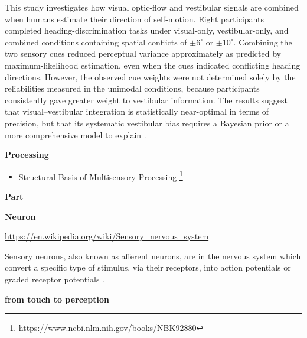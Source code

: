 \documentclass{book}
\providecommand{\ProjectDeepHeading}[2]{%
    \par\medskip\noindent\textbf{#2}\par\smallskip
}
\providecommand{\seeherefooter}[1]{\footnote{\url{#1}}}
\begin{document}
This study investigates how visual optic-flow and vestibular signals are combined when humans estimate their direction of self-motion.
    Eight participants completed heading-discrimination tasks under visual-only, vestibular-only, and combined conditions containing spatial conflicts of $\pm 6^{\circ}$ or $\pm 10^{\circ}$.
    Combining the two sensory cues reduced perceptual variance approximately as predicted by maximum-likelihood estimation, even when the cues indicated conflicting heading directions.
    However, the observed cue weights were not determined solely by the reliabilities measured in the unimodal conditions, because participants consistently gave greater weight to vestibular information.
    The results suggest that visual--vestibular integration is statistically near-optimal in terms of precision, but that its systematic vestibular bias requires a Bayesian prior or a more comprehensive model to explain \cite{butler-2010-bayesian-integration-of-visual-and-vestibular-signals-for-heading}.

\ProjectDeepHeading{4}{Processing}


\begin{itemize}
        \item Structural Basis of Multisensory Processing \seeherefooter{https://www.ncbi.nlm.nih.gov/books/NBK92880}
    \end{itemize}

\ProjectDeepHeading{3}{Part}

\ProjectDeepHeading{4}{Neuron}


\url{https://en.wikipedia.org/wiki/Sensory_nervous_system}
    
    



    
    
    
    Sensory neurons, also known as afferent neurons, are in the nervous system which convert a specific type of stimulus, via their receptors, into action potentials or graded receptor potentials .


\ProjectDeepHeading{7}{from touch to perception}
\end{document}
